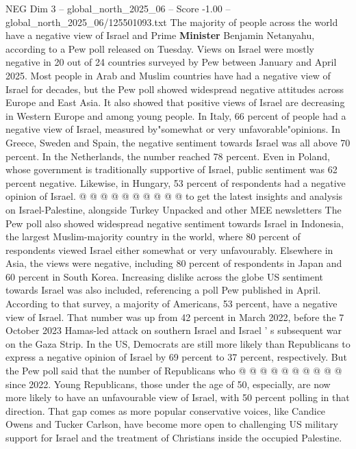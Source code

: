 \begin{textsample}{NEG Dim 3 – global\_north\_2025\_06 – Score -1.00 – global\_north\_2025\_06/125501093.txt}  \label{ex:f3_neg_356}
The majority of people across the world have a negative view of Israel and Prime \textbf{Minister} Benjamin Netanyahu, according to a Pew poll released on Tuesday.
Views on Israel were mostly negative in 20 out of 24 countries surveyed by Pew between January and April 2025.
Most people in Arab and Muslim countries have had a negative view of Israel for decades, but the Pew poll showed widespread negative attitudes across Europe and East Asia.
It also showed that positive views of Israel are decreasing in Western Europe and among young people.
In Italy, 66 percent of people had a negative view of Israel, measured by"somewhat or very unfavorable"opinions.
In Greece, Sweden and Spain, the negative sentiment towards Israel was all above 70 percent.
In the Netherlands, the number reached 78 percent.
Even in Poland, whose government is traditionally supportive of Israel, public sentiment was 62 percent negative.
Likewise, in Hungary, 53 percent of respondents had a negative opinion of Israel. @ @ @ @ @ @ @ @ @ @ to get the latest insights and analysis on Israel-Palestine, alongside Turkey Unpacked and other MEE newsletters The Pew poll also showed widespread negative sentiment towards Israel in Indonesia, the largest Muslim-majority country in the world, where 80 percent of respondents viewed Israel either somewhat or very unfavourably.
Elsewhere in Asia, the views were negative, including 80 percent of respondents in Japan and 60 percent in South Korea.
Increasing dislike across the globe US sentiment towards Israel was also included, referencing a poll Pew published in April.
According to that survey, a majority of Americans, 53 percent, have a negative view of Israel.
That number was up from 42 percent in March 2022, before the 7 October 2023 Hamas-led attack on southern Israel and Israel ' s subsequent war on the Gaza Strip.
In the US, Democrats are still more likely than Republicans to express a negative opinion of Israel by 69 percent to 37 percent, respectively.
But the Pew poll said that the number of Republicans who @ @ @ @ @ @ @ @ @ @ since 2022.
Young Republicans, those under the age of 50, especially, are now more likely to have an unfavourable view of Israel, with 50 percent polling in that direction.
That gap comes as more popular conservative voices, like Candice Owens and Tucker Carlson, have become more open to challenging US military support for Israel and the treatment of Christians inside the occupied Palestine.

\end{textsample}
